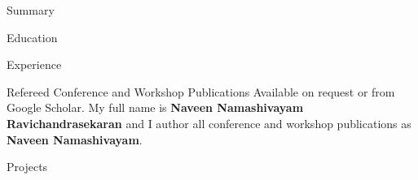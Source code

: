 \documentclass{resume}
\begin{document}

\begin{rSection}{Summary}

\end{rSection}


\begin{rSection}{Education}

\end{rSection}


\begin{rSection}{Experience}

\end{rSection}


\begin{rSection}{Refereed Conference and Workshop Publications}
Available on request or from Google Scholar. My full name is
\textbf{Naveen Namashivayam Ravichandrasekaran} and I author all
conference and workshop publications as \textbf{Naveen Namashivayam}.

\end{rSection}



\begin{rSection}{Projects}

\end{rSection}
\end{document}
